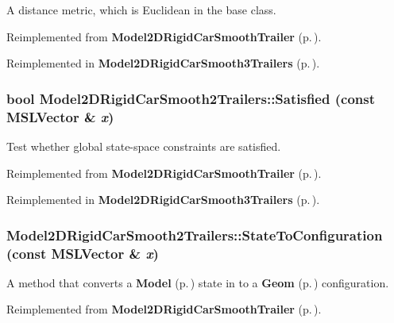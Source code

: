 A distance metric, which is Euclidean in the base class.



Reimplemented from {\bf Model2DRigid\-Car\-Smooth\-Trailer} {\rm (p.\,\pageref{classModel2DRigidCarSmoothTrailer_a3})}.

Reimplemented in {\bf Model2DRigid\-Car\-Smooth3Trailers} {\rm (p.\,\pageref{classModel2DRigidCarSmooth3Trailers_a3})}.
\subsubsection{\setlength{\rightskip}{0pt plus 5cm}bool Model2DRigid\-Car\-Smooth2Trailers::Satisfied (const {\bf MSLVector} \& {\em x})\hspace{0.3cm}{\tt  [virtual]}}\label{classModel2DRigidCarSmooth2Trailers_a5}


Test whether global state-space constraints are satisfied.



Reimplemented from {\bf Model2DRigid\-Car\-Smooth\-Trailer} {\rm (p.\,\pageref{classModel2DRigidCarSmoothTrailer_a5})}.

Reimplemented in {\bf Model2DRigid\-Car\-Smooth3Trailers} {\rm (p.\,\pageref{classModel2DRigidCarSmooth3Trailers_a5})}.
\subsubsection{ Model2DRigid\-Car\-Smooth2Trailers::State\-To\-Configuration (const {\bf MSLVector} \& {\em x})\hspace{0.3cm}{\tt  [virtual]}}\label{classModel2DRigidCarSmooth2Trailers_a4}


A method that converts a {\bf Model} {\rm (p.\,\pageref{classModel})} state in to a {\bf Geom} {\rm (p.\,\pageref{classGeom})} configuration.



Reimplemented from {\bf Model2DRigid\-Car\-Smooth\-Trailer} {\rm (p.\,\pageref{classModel2DRigidCarSmoothTrailer_a4})}.

